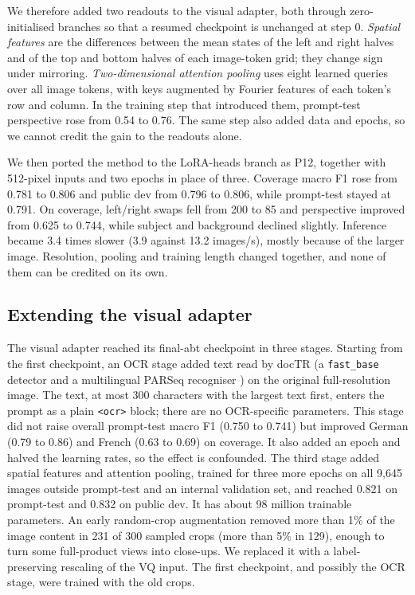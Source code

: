 \documentclass[11pt]{article}
\begin{document}
We therefore added two readouts to the visual adapter, both through zero-initialised branches so that a resumed checkpoint is unchanged at step 0. \emph{Spatial features} are the differences between the mean states of the left and right halves and of the top and bottom halves of each image-token grid; they change sign under mirroring. \emph{Two-dimensional attention pooling} uses eight learned queries over all image tokens, with keys augmented by Fourier features of each token's row and column. In the training step that introduced them, prompt-test perspective rose from 0.54 to 0.76. The same step also added data and epochs, so we cannot credit the gain to the readouts alone.

We then ported the method to the LoRA-heads branch as P12, together with 512-pixel inputs and two epochs in place of three. Coverage macro F1 rose from 0.781 to 0.806 and public dev from 0.796 to 0.806, while prompt-test stayed at 0.791. On coverage, left/right swaps fell from 200 to 85 and perspective improved from 0.625 to 0.744, while subject and background declined slightly. Inference became 3.4 times slower (3.9 against 13.2 images/s), mostly because of the larger image. Resolution, pooling and training length changed together, and none of them can be credited on its own.

\subsection{Extending the visual adapter}
\label{sec:extend}
The visual adapter reached its final-abt checkpoint in three stages. Starting from the first checkpoint, an OCR stage added text read by docTR \cite{doctr} (a \texttt{fast\_base} detector and a multilingual PARSeq recogniser \cite{parseq}) on the original full-resolution image. The text, at most 300 characters with the largest text first, enters the prompt as a plain \texttt{<ocr>} block; there are no OCR-specific parameters. This stage did not raise overall prompt-test macro F1 (0.750 to 0.741) but improved German (0.79 to 0.86) and French (0.63 to 0.69) on coverage. It also added an epoch and halved the learning rates, so the effect is confounded. The third stage added spatial features and attention pooling, trained for three more epochs on all 9,645 images outside prompt-test and an internal validation set, and reached 0.821 on prompt-test and 0.832 on public dev. It has about 98 million trainable parameters. An early random-crop augmentation removed more than 1\% of the image content in 231 of 300 sampled crops (more than 5\% in 129), enough to turn some full-product views into close-ups. We replaced it with a label-preserving rescaling of the VQ input. The first checkpoint, and possibly the OCR stage, were trained with the old crops.
\end{document}
